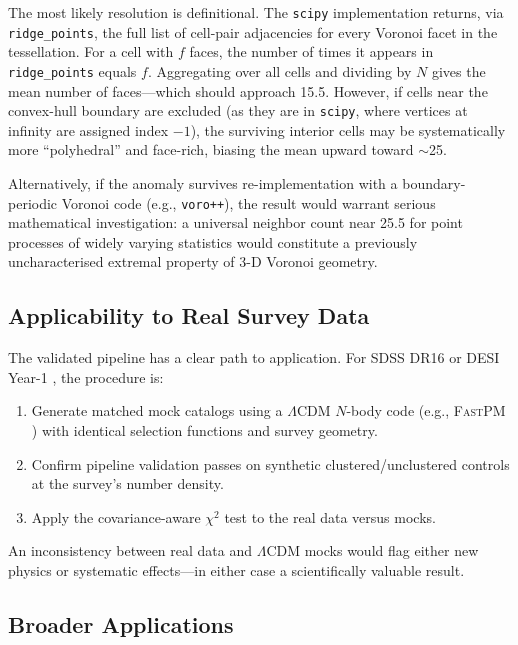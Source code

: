 \documentclass[12pt,a4paper]{article}
\begin{document}
The most likely resolution is definitional.  The \texttt{scipy} implementation
returns, via \texttt{ridge\_points}, the full list of cell-pair adjacencies for
every Voronoi facet in the tessellation.  For a cell with $f$ faces, the number
of times it appears in \texttt{ridge\_points} equals $f$.  Aggregating over all
cells and dividing by $N$ gives the mean number of faces---which should approach
15.5.  However, if cells near the convex-hull boundary are excluded (as they are
in \texttt{scipy}, where vertices at infinity are assigned index $-1$), the
surviving interior cells may be systematically more ``polyhedral'' and face-rich,
biasing the mean upward toward $\sim$25.

Alternatively, if the anomaly survives re-implementation with a boundary-periodic
Voronoi code (e.g., \texttt{voro++}), the result would warrant serious
mathematical investigation: a universal neighbor count near 25.5 for point
processes of widely varying statistics would constitute a previously uncharacterised
extremal property of 3-D Voronoi geometry.

\subsection{Applicability to Real Survey Data}

The validated pipeline has a clear path to application.  For SDSS DR16
\citep{ahumada2020sloan} or DESI Year-1 \citep{desi2023firstlight}, the
procedure is:

\begin{enumerate}
  \item Generate matched mock catalogs using a $\Lambda$CDM $N$-body code
        (e.g., \textsc{FastPM} \citep{feng2016fastpm}) with identical selection
        functions and survey geometry.
  \item Confirm pipeline validation passes on synthetic clustered/unclustered
        controls at the survey's number density.
  \item Apply the covariance-aware $\chi^2$ test to the real data versus mocks.
\end{enumerate}

An inconsistency between real data and $\Lambda$CDM mocks would flag either new
physics or systematic effects---in either case a scientifically valuable result.

\subsection{Broader Applications}
\end{document}
